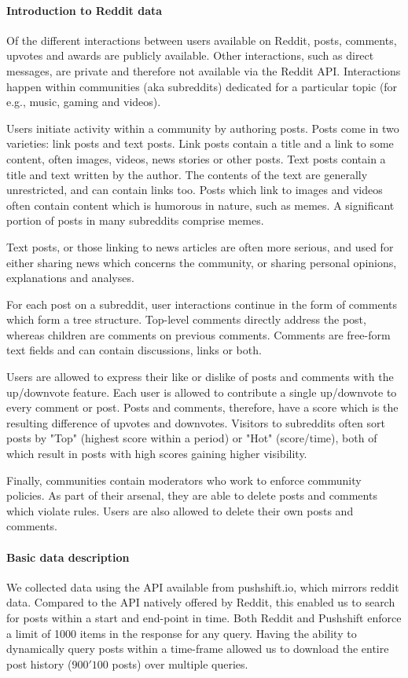 \documentclass[noacm,sigconf,authorversion]{acmart}
\begin{document}
\paragraph{Introduction to Reddit data}
Of the different interactions between users available on Reddit, posts, comments, upvotes and awards are publicly available. 
Other interactions, such as direct messages, are private and therefore not available via the Reddit API. 
Interactions happen within communities (aka subreddits) dedicated for a particular topic (for e.g., music, gaming and videos). 

Users initiate activity within a community by authoring posts. 
Posts come in two varieties: link posts and text posts. 
Link posts contain a title and a link to some content, often images, videos, news stories or other posts. 
Text posts contain a title and text written by the author. The contents of the text are generally unrestricted, and can contain links too. 
Posts which link to images and videos often contain content which is humorous in nature, such as memes. 
A significant portion of posts in many subreddits comprise memes.

Text posts, or those linking to news articles are often more serious, and used for either sharing news which concerns the community, or sharing personal opinions, explanations and analyses.

For each post on a subreddit, user interactions continue in the form of comments which form a tree structure. 
Top-level comments directly address the post, whereas children are comments on previous comments. 
Comments are free-form text fields and can contain discussions, links or both. 

Users are allowed to express their like or dislike of posts and comments with the up/downvote feature. 
Each user is allowed to contribute a single up/downvote to every comment or post. 
Posts and comments, therefore, have a score which is the resulting difference of upvotes and downvotes. 
Visitors to subreddits often sort posts by "Top" (highest score within a period) or "Hot" (score/time), both of which result in posts with high scores gaining higher visibility. 

Finally, communities contain moderators who work to enforce community policies. 
As part of their arsenal, they are able to delete posts and comments which violate rules.
Users are also allowed to delete their own posts and comments.

\paragraph{Basic data description}
We collected data using the API available from pushshift.io, which mirrors reddit data. 
Compared to the API natively offered by Reddit, this enabled us to search for posts within a start and end-point in time. 
Both Reddit and Pushshift enforce a limit of 1000 items in the response for any query. 
Having the ability to dynamically query posts within a time-frame allowed us to download the entire post history ($900'100$ posts) over multiple queries. 
\end{document}
